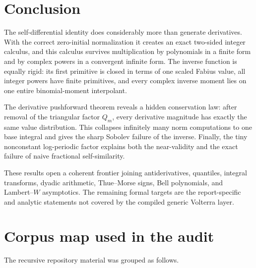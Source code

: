 \documentclass[11pt,oneside]{article}
\theoremstyle{definition}
\theoremstyle{remark}
\newcommand{\1}{\mathbf 1}
\begin{document}
\section{Conclusion}

The self-differential identity does considerably more than generate derivatives.  With
the correct zero-initial normalization it creates an exact two-sided integer calculus,
and this calculus survives multiplication by polynomials in a finite form and by complex
powers in a convergent infinite form.  The inverse function is equally rigid: its first
primitive is closed in terms of one scaled Fabius value, all integer powers have finite
primitives, and every complex inverse moment lies on one entire binomial-moment
interpolant.

The derivative pushforward theorem reveals a hidden conservation law: after removal of
the triangular factor \(Q_m\), every derivative magnitude has exactly the same value
distribution.  This collapses infinitely many norm computations to one base integral
and gives the sharp Sobolev failure of the inverse.  Finally, the tiny nonconstant
log-periodic factor explains both the near-validity and the exact failure of naive
fractional self-similarity.

These results open a coherent frontier joining antiderivatives, quantiles, integral
transforms, dyadic arithmetic, Thue--Morse signs, Bell polynomials, and Lambert--\(W\)
asymptotics.  The remaining formal targets are the report-specific and analytic statements
not covered by the compiled generic Volterra layer.

\appendix
\section{Corpus map used in the audit}

The recursive repository material was grouped as follows.
\end{document}
